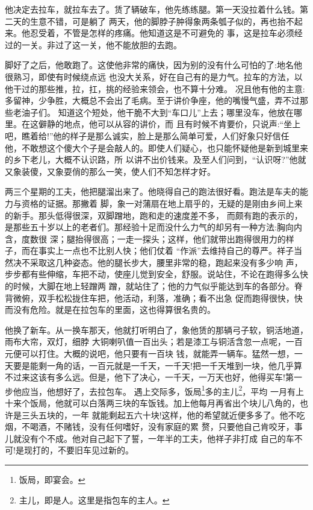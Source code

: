 \documentclass[11pt,a4paper,onecolumn]{article}
\begin{document}
他决定去拉车，就拉车去了。赁了辆破车，他先练练腿。第一天没拉着什么钱。第二天的生意不错，可是躺了
两天，他的脚脖子肿得象两条瓠子似的，再也抬不起来。他忍受着，不管是怎样的疼痛。他知道这是不可避免的
事，这是拉车必须经过的一关。非过了这一关，他不能放胆的去跑。

脚好了之后，他敢跑了。这使他非常的痛快，因为别的没有什么可怕的了:地名他很熟习，即使有时候绕点远
也没大关系，好在自己有的是力气。拉车的方法，以他干过的那些推，拉，扛，挑的经验来领会，也不算十分难。
况且他有他的主意:多留神，少争胜，大概总不会出了毛病。至于讲价争座，他的嘴慢气盛，弄不过那些老油子们。
知道这个短处，他干脆不大到``车口儿''上去；哪里没车，他放在哪里。在这僻静的地点，他可以从容的讲价，而
且有时候不肯要价，只说声:``坐上吧，瞧着给!''他的样子是那么诚实，脸上是那么简单可爱，人们好象只好信任
他，不敢想这个傻大个子是会敲人的。即使人们疑心，也只能怀疑他是新到城里来的乡下老儿，大概不认识路，所
以讲不出价钱来。及至人们问到，``认识呀?''他就又象装傻，又象耍俏的那么一笑，使人们不知怎样才好。

两三个星期的工夫，他把腿溜出来了。他晓得自己的跑法很好看。跑法是车夫的能力与资格的证据。那撇着
脚，象一对蒲扇在地上扇乎的，无疑的是刚由乡间上来的新手。那头低得很深，双脚蹭地，跑和走的速度差不多，
而颇有跑的表示的，是那些五十岁以上的老者们。那经验十足而没什么力气的却另有一种方法:胸向内含，度数很
深；腿抬得很高；一走一探头；这样，他们就带出跑得很用力的样子，而在事实上一点也不比别人快；他们仗着
``作派''去维持自己的尊严。祥子当然决不采取这几种姿态。他的腿长步大，腰里非常的稳，跑起来没有多少响
声，步步都有些伸缩，车把不动，使座儿觉到安全，舒服。说站住，不论在跑得多么快的时候，大脚在地上轻蹭两
蹭，就站住了；他的力气似乎能达到车的各部分。脊背微俯，双手松松拢住车把，他活动，利落，准确；看不出急
促而跑得很快，快而没有危险。就是在拉包车的里面，这也得算很名贵的。

他换了新车。从一换车那天，他就打听明白了，象他赁的那辆\myrule 弓子软，铜活地道，雨布大帘，双灯，细脖
大铜喇叭\myrule 值一百出头；若是漆工与铜活含忽一点呢，一百元便可以打住。大概的说吧，他只要有一百块
钱，就能弄一辆车。猛然一想，一天要是能剩一角的话，一百元就是一千天，一千天!把一千天堆到一块，他几乎算
不过来这该有多么远。但是，他下了决心，一千天，一万天也好，他得买车!第一步他应当，他想好了，去拉包车。
遇上交际多，饭局\footnote{饭局，即宴会。}多的主儿\footnote{主儿，即是人。这里是指包车的主人。}，平均
一月有上十来个饭局，他就可以白落两三块的车饭钱。加上他每月再省出个块儿八角的，也许是三头五块的，一年
就能剩起五六十块!这样，他的希望就近便多多了。他不吃烟，不喝酒，不赌钱，没有任何嗜好，没有家庭的累
赘，只要他自己肯咬牙，事儿就没有个不成。他对自己起下了誓，一年半的工夫，他\myrule 祥子\myrule 非打成
自己的车不可!是现打的，不要旧车见过新的。
\end{document}
